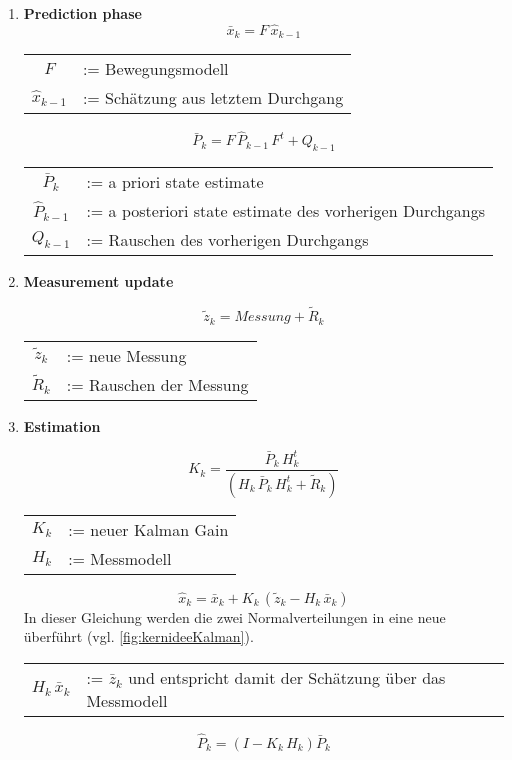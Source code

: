 \begin{enumerate}
	\item \textbf{Prediction phase}
	\begin{equation}
	 \bar{x}_k = F \, \hat{x}_{k-1}
	\end{equation}
	
	\begin{tabular}{cl}
	$F$ &:= Bewegungsmodell \\
	$\hat{x}_{k-1}$ &:= Schätzung aus letztem Durchgang
	\end{tabular}
	
	\begin{equation}
	\bar{P}_k = F \, \hat{P}_{k-1} \, F^t + Q_{k-1}
	\end{equation}
	
	\begin{tabular}{cl}
	$\bar{P}_k$ & := a priori state estimate \\
	$\hat{P}_{k-1}$ & := a posteriori state estimate des vorherigen Durchgangs \\
	$Q_{k-1}$ & := Rauschen des vorherigen Durchgangs \\
	\end{tabular}
	
	
	
	
	\item \textbf{Measurement update}
	
	\begin{equation}
		\tilde{z}_k = Messung + \tilde{R}_k
	\end{equation}
	
	\begin{tabular}{cl}
		$\tilde{z}_k$ & := neue Messung \\
		$\tilde{R}_k$ & := Rauschen der Messung
	\end{tabular}
	
	
	

	\item \textbf{Estimation}
	
	\begin{equation}
	K_k = \frac{\bar{P}_k \, H^t_k} {(H_k \, \bar{P}_k \, H^t_k + \tilde{R}_k)}
	\end{equation}
	\begin{tabular}{cl}
		$K_k$ & := neuer Kalman Gain \\
		$H_k$ & := Messmodell
	\end{tabular}


	\begin{equation}
		\hat{x}_k = \bar{x}_k + K_k \, (\tilde{z}_k - H_k \, \bar{x}_k)
	\end{equation}
	In dieser Gleichung werden die zwei Normalverteilungen in eine neue überführt (vgl. \ref{fig:kernideeKalman}). 
	
	\begin{tabular}{cl}
		$H_k \, \bar{x}_k$ & := $\bar{z}_k$ und entspricht damit der Schätzung über das Messmodell\\
	\end{tabular}

	\begin{equation}
		\hat{P}_k = (I - K_k \, H_k)\bar{P}_k
	\end{equation}
	
	
	
\end{enumerate}
